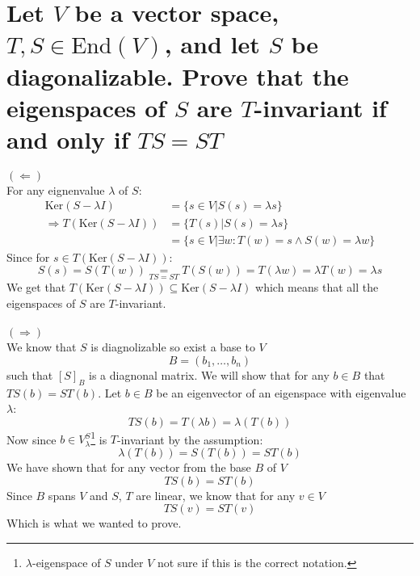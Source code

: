 \documentclass[11pt,a4paper]{article}
\theoremstyle{plain}
\newcommand{\Ker}{\text{Ker}}
\begin{document}
	\newpage
	
	\section{Let $V$ be a vector space, $T,S\in \text{End}(V)$, and let $S$ be 
	diagonalizable. Prove that the eigenspaces of $S$ are $T$-invariant if 
	and only if $TS = ST$}
	{$(\Leftarrow)$} \\
	For any eignenvalue $\lambda$ of $S$:
	\begin{align*}
		\Ker(S-\lambda I) &= \{s \in V \vert S(s) = \lambda s\} \\
		\Rightarrow T(\Ker(S-\lambda I)) &= \{T(s) \vert S(s) = \lambda s\} \\
		&= \{s \in V \vert \exists w\colon T(w) = s \land S(w) = \lambda w\}
	\end{align*}
	Since for $s\in T(\Ker(S-\lambda I))$:
	\[
		S(s) = S(T(w)) \underset{TS=ST}{=} T(S(w)) = T(\lambda w) = 
		\lambda T(w) = \lambda s
	\]
	We get that $T(\Ker(S-\lambda I)) \subseteq \Ker(S-\lambda I)$ which means
	that all the eigenspaces of $S$ are $T$-invariant. \\\\
	{$(\Rightarrow)$} \\
	We know that $S$ is diagnolizable so exist a base to $V$
	\[
	 B = (b_1,\dots,b_n)
	\]
	such that $[S]_B$ is a diagnonal matrix. We will show that for any $b\in B$
	that $TS(b) = ST(b)$. Let $b\in B$ be an eigenvector of an eigenspace
	with eigenvalue $\lambda$:
	\[
		TS(b) = T(\lambda b) = \lambda (T(b))
	\]
	Now since $b\in V_\lambda^S$\footnote{$\lambda$-eigenspace of $S$ under $V$
	not sure if this is the correct notation.} is $T$-invariant by the
	assumption:
	\[
		\lambda (T(b)) = S(T(b)) = ST(b)
	\]
	We have shown that for any vector from the base $B$ of $V$
	\[
		TS(b) = ST(b)
	\]
	Since $B$ spans $V$ and $S$, $T$ are linear, we know that for any $v\in V$
	\[
		TS(v) = ST(v)
	\]
	Which is what we wanted to prove.
	
	\newpage
	
\end{document}
